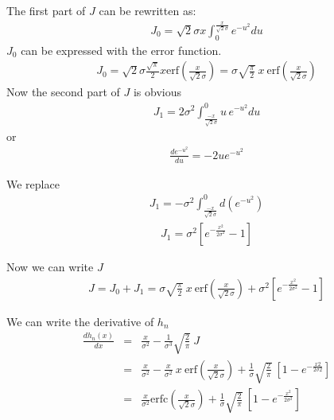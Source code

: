 The first part of $J$ can be rewritten as:
\begin{eqnarray}
 J_{0} = \sqrt{2}\sigma x \int_{0}^{\frac{x}{\sqrt{2}\sigma} } 
 e^{-u^{2}} du  
\end{eqnarray}
$ J_{0} $ can be expressed with the error function.
\begin{eqnarray}
 J_{0} = \sqrt{2}\sigma \frac{\sqrt{\pi}}{2} x  \mbox{erf}\left(\frac{x}{\sqrt{2}\sigma}\right) 
       = \sigma \sqrt{\frac{\pi}{2}} \: x \:  \mbox{erf}\left(\frac{x}{\sqrt{2}\sigma}\right) 
\end{eqnarray}
Now the second part of $J$ is obvious
\begin{eqnarray}
 J_{1} = 2 \sigma^{2} \int_{\frac{-x}{\sqrt{2}\sigma} }^{0} u \,
 e^{-u^{2}} du  
\end{eqnarray}
 or
\begin{eqnarray}
\frac{d e^{-u^{2}}} {du} = -2 u e^{-u^{2}} 
\end{eqnarray}

We replace
\begin{eqnarray}
 J_{1} = -\sigma^{2}  \int_{\frac{-x}{\sqrt{2}\sigma} }^{0} d(e^{-u^{2}})  
\end{eqnarray}
\begin{eqnarray}
 J_{1} = \sigma^{2}  [e^{-\frac{x^{2}}{2\sigma^{2}}} - 1]  
\end{eqnarray}

Now we can write $J$
\begin{eqnarray}
 J = J_{0} + J_{1}
  = \sigma \sqrt{\frac{\pi}{2}} \: x \:  \mbox{erf}\left(\frac{x}{\sqrt{2}\sigma}\right) 
    + \sigma^{2}  \left[e^{-\frac{x^{2}}{2\sigma^{2}}} - 1 \right]  
\end{eqnarray}

We can write the derivative of $h_n$
\begin{eqnarray}
\frac{d h_{n}(x)}{dx} & = & 
\frac{x}{\sigma^{2}}   -
\frac{1}{\sigma^{3}} \sqrt{\frac{2}{\pi} } \: J \nonumber \\
                   & = &   \frac{x}{\sigma^{2}} -
  \frac{x}{\sigma^{2}}\: x \:  \mbox{erf}\left(\frac{x}{\sqrt{2}\sigma}\right)
  + \frac{1}{\sigma} \sqrt{\frac{2}{\pi} } \:
      \left[1 - e^{-\frac{x{2}}{2\sigma{2}}}\right]  \nonumber \\
                    & = &  \frac{x}{\sigma^{2}}\mbox{erfc}\left(\frac{x}{\sqrt{2}\sigma}\right)
    + \frac{1}{\sigma} \sqrt{\frac{2}{\pi} } \:
      \left[1 - e^{-\frac{x^{2}}{2\sigma^{2}}}\right] 
\label{eqn_n2_hn}
\end{eqnarray}

